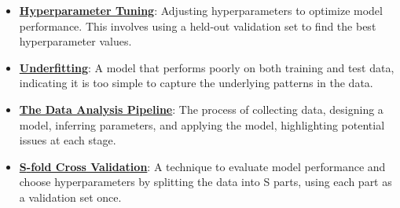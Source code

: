 \documentclass{article}%
\begin{document}
\begin{itemize}[leftmargin=*]%
\item \href{https://purdue.brightspace.com/d2l/common/assets/pdfjs-d2l-dist/1.0.14-legacy/web/viewer.html?file=%2Fcontent%2Fenforced%2F1095467-wl.202510.CS.24300.001%2F10L1-CrossValidation.pdf%3Fou%3D1095467&lang=en-us&container=d2l-fileviewer-rendered-pdf&fullscreen=d2l-fileviewer-rendered-pdf-dialog&height=667#page=14}{\textbf{Hyperparameter Tuning}}: Adjusting hyperparameters to optimize model performance. This involves using a held-out validation set to find the best hyperparameter values.%
\item \href{https://purdue.brightspace.com/d2l/common/assets/pdfjs-d2l-dist/1.0.14-legacy/web/viewer.html?file=%2Fcontent%2Fenforced%2F1095467-wl.202510.CS.24300.001%2F10L1-CrossValidation.pdf%3Fou%3D1095467&lang=en-us&container=d2l-fileviewer-rendered-pdf&fullscreen=d2l-fileviewer-rendered-pdf-dialog&height=667#page=21}{\textbf{Underfitting}}: A model that performs poorly on both training and test data, indicating it is too simple to capture the underlying patterns in the data.%
\item \href{https://purdue.brightspace.com/d2l/common/assets/pdfjs-d2l-dist/1.0.14-legacy/web/viewer.html?file=%2Fcontent%2Fenforced%2F1095467-wl.202510.CS.24300.001%2F10L1-CrossValidation.pdf%3Fou%3D1095467&lang=en-us&container=d2l-fileviewer-rendered-pdf&fullscreen=d2l-fileviewer-rendered-pdf-dialog&height=667#page=26}{\textbf{The Data Analysis Pipeline}}: The process of collecting data, designing a model, inferring parameters, and applying the model, highlighting potential issues at each stage.%
\item \href{https://purdue.brightspace.com/d2l/common/assets/pdfjs-d2l-dist/1.0.14-legacy/web/viewer.html?file=%2Fcontent%2Fenforced%2F1095467-wl.202510.CS.24300.001%2F10L1-CrossValidation.pdf%3Fou%3D1095467&lang=en-us&container=d2l-fileviewer-rendered-pdf&fullscreen=d2l-fileviewer-rendered-pdf-dialog&height=667#page=25}{\textbf{S{-}fold Cross Validation}}: A technique to evaluate model performance and choose hyperparameters by splitting the data into S parts, using each part as a validation set once.%
\end{itemize}%
\end{document}
